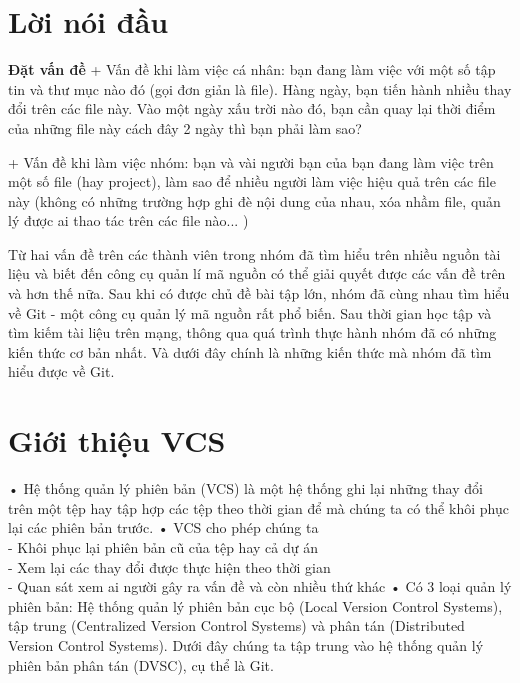 \documentclass[12pt,a4paper]{report}
\begin{document}
\chapter{Lời nói đầu}
{\bf Đặt vấn đề}\vskip 0.4cm
+ Vấn đề khi làm việc cá nhân: bạn đang làm việc với một số tập tin và thư mục nào đó (gọi đơn giản là file). Hàng ngày, bạn tiến hành nhiều thay đổi trên các file này. Vào một ngày xấu trời nào đó, bạn cần quay lại thời điểm của những file này cách đây 2 ngày thì bạn phải làm sao?\vskip 0.4cm

+ Vấn đề khi làm việc nhóm: bạn và vài người bạn của bạn đang làm việc trên một số file (hay project), làm sao để nhiều người làm việc hiệu quả trên các file này (không có những trường hợp ghi đè nội dung của nhau, xóa nhầm file, quản lý được ai thao tác trên các file nào... )\vskip 0.4cm

Từ hai vấn đề trên các thành viên trong nhóm đã tìm hiểu trên nhiều nguồn tài liệu và biết đến công cụ quản lí mã nguồn có thể giải quyết được các vấn đề trên và hơn thế nữa. Sau khi có được chủ đề bài tập lớn, nhóm đã cùng nhau tìm hiểu về Git - một công cụ quản lý mã nguồn rất phổ biến. Sau thời gian học tập và tìm kiếm tài liệu trên mạng, thông qua quá trình thực hành nhóm đã có những kiến thức cơ bản nhất. Và dưới đây chính là những kiến thức mà nhóm đã tìm hiểu được về Git.


\tableofcontents %

\chapter{Giới thiệu VCS} %


\hspace{0.6cm} •	Hệ thống quản lý phiên bản (VCS) là một hệ thống ghi lại những thay đổi trên một tệp hay tập hợp các tệp theo thời gian để mà chúng ta có thể khôi phục lại các phiên bản trước.
\vskip 0.4cm
•	VCS cho phép chúng ta \\
- Khôi phục lại phiên bản cũ của tệp hay cả dự án\\
- Xem lại các thay đổi được thực hiện theo thời gian\\
- Quan sát xem ai người gây ra vấn đề và còn nhiều thứ khác\vskip 0.4cm
•	Có 3 loại quản lý phiên bản: Hệ thống quản lý phiên bản cục bộ (Local Version Control Systems), tập trung (Centralized Version Control Systems) và phân tán (Distributed Version Control Systems). Dưới đây chúng ta tập trung vào hệ thống quản lý phiên bản phân tán (DVSC), cụ thể là Git.\\
\end{document}
